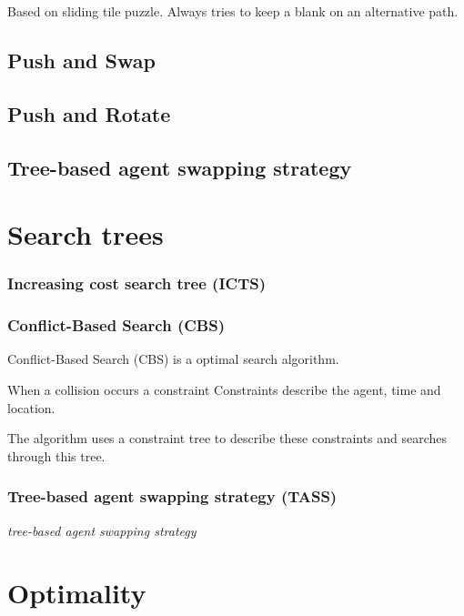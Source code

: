 \documentclass[a4paper,11pt]{article}
\begin{document}
Based on sliding tile puzzle. Always tries to keep a blank on an alternative path.

\subsection{Push and Swap}

\subsection{Push and Rotate}

\subsection{Tree-based agent swapping strategy}


\section{Search trees}
\subsubsection{Increasing cost search tree (ICTS)}


\subsubsection{Conflict-Based Search (CBS)}
Conflict-Based Search (CBS) is a optimal search algorithm.

When a collision occurs a constraint 
Constraints describe the agent, time and location.

The algorithm uses a constraint tree to describe these constraints and searches through this tree.

\subsubsection*{Tree-based agent swapping strategy (TASS)}
\textit{tree-based agent swapping strategy}






\section{Optimality}
\end{document}
